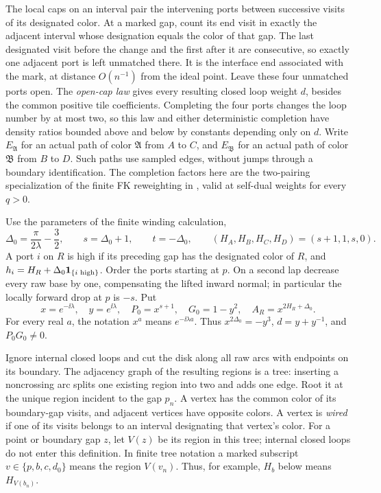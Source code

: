 The local caps on an interval pair the intervening ports between
successive visits of its designated color.  At a marked gap, count its
end visit in exactly the adjacent interval whose designation equals
the color of that gap.  The last designated visit before the change
and the first after it are consecutive, so exactly one adjacent port
is left unmatched there.  It is the interface end associated with
the mark, at distance $O(n^{-1})$ from the ideal point.  Leave these
four unmatched ports open.  The
\emph{open-cap law} gives every resulting closed loop weight $d$, besides
the common positive tile coefficients.  Completing the four ports changes
the loop number by at most two, so this law and either deterministic
completion have density ratios bounded above and below by constants
depending only on $d$.  Write $E_{\mathfrak A}$ for an actual path of
color $\mathfrak A$ from $A$ to $C$, and $E_{\mathfrak B}$ for an actual
path of color $\mathfrak B$ from $B$ to $D$.  Such paths use sampled
edges, without jumps through a boundary identification.
The completion factors here are the two-pairing specialization of the
finite FK reweighting in
\cite[Proposition~4.6, equations~(4.17)--(4.19)]{FengPeltolaWu2024FKConnections},
valid at self-dual weights for every $q>0$.

Use the parameters of the finite winding calculation,
\begin{equation}
 \Delta_0=\frac{\pi}{2\lambda}-\frac32,\qquad
 s=\Delta_0+1,\qquad t=-\Delta_0,
 \qquad (H_A,H_B,H_C,H_D)=(s+1,1,s,0).
 \label{obs:bases}
\end{equation}
A port $i$ on $R$ is high if its preceding gap has the designated
color of $R$, and
$h_i=H_R+\Delta_0\mathbf 1_{\{i\text{ high}\}}$.
Order the ports starting at $p$.  On a second lap decrease every raw
base by one, compensating the lifted inward normal; in particular the
locally forward drop at $p$ is $-s$.  Put
\begin{equation}
 x=e^{-\ii\lambda},\quad y=e^{\ii\lambda},\quad
 P_0=x^{s+1},\quad G_0=1-y^2,\quad A_R=x^{2H_R+\Delta_0}.
 \label{obs:tree-normalization}
\end{equation}
For every real $a$, the notation $x^a$ means $e^{-\ii\lambda a}$.
Thus $x^{2\Delta_0}=-y^3$, $d=y+y^{-1}$, and $P_0G_0\ne0$.

Ignore internal closed loops and cut the disk along all raw arcs with
endpoints on its boundary.  The adjacency graph of the resulting
regions is a tree: inserting a noncrossing arc splits one existing
region into two and adds one edge.  Root it at the unique region
incident to the gap $p_n$.  A vertex has the common color of its
boundary-gap visits, and
adjacent vertices have opposite colors.  A vertex is \emph{wired} if
one of its visits belongs to an interval designating that vertex's
color.  For a point or boundary gap $z$, let $V(z)$ be its region in
this tree; internal closed loops do not enter this definition.  In
finite tree notation a marked subscript $v\in\{p,b,c,d_0\}$ means
the region $V(v_n)$.  Thus, for example, $H_b$ below means $H_{V(b_n)}$.

